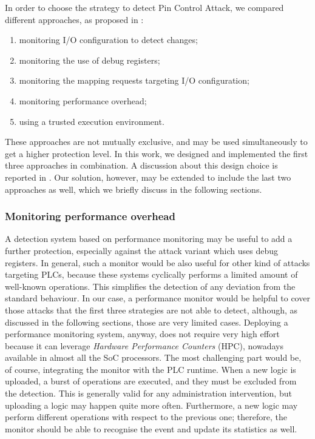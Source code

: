 In order to choose the strategy to detect Pin Control Attack, we compared different approaches, as proposed in \cite{ghostplc}:
\begin{enumerate}
	\item monitoring I/O configuration to detect changes;
	\item monitoring the use of debug registers;
	\item monitoring the mapping requests targeting I/O configuration;
	\item monitoring performance overhead;
	\item using a trusted execution environment.
\end{enumerate}
These approaches are not mutually exclusive, and may be used simultaneously to get a higher protection level.
In this work, we designed and implemented the first three approaches in combination. A discussion about this design choice is reported in .
Our solution, however, may be extended to include the last two approaches as well, which we briefly discuss in the following sections.


\subsubsection{Monitoring performance overhead}

A detection system based on performance monitoring may be useful to add a further protection, especially against the attack variant
which uses debug registers. In general, such a monitor would be also useful for other kind of attacks targeting PLCs, because these systems cyclically performs
a limited amount of well-known operations. This simplifies the detection of any deviation from the standard behaviour.
In our case, a performance monitor would be helpful to cover those attacks that the first three strategies are not able to detect,
although, as discussed in the following sections, those are very limited cases.
Deploying a performance monitoring system, anyway, does not require very high effort because it can leverage \emph{Hardware Performance Counters} (HPC),
nowadays available in almost all the SoC processors. The most challenging part would be, of course, integrating the monitor with the PLC runtime.
When a new logic is uploaded, a burst of operations are executed, and they must be excluded from the detection. This is generally valid for any
administration intervention, but uploading a logic may happen quite more often. Furthermore, a new logic may perform different operations
with respect to the previous one; therefore, the monitor should be able to recognise the event and update its statistics as well.


